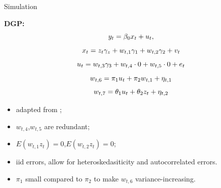 \documentclass[final]{beamer}
\newlength{\colwidth}
\begin{document}
\begin{frame}[t]
\begin{columns}[t]
\begin{column}{\colwidth}
  
  \begin{block}{Simulation}
    \begin{minipage}[c]{0.5\textwidth}
    \textbf{DGP:}
     $$
  y_{t}=\beta_{0}x_{t}+u_{t}, 
\vspace{-3mm}
  $$  
  $$ 
  x_{t}= z_{t}\gamma_z +  w_{t,1}\gamma_{1}+w_{t,2}\gamma_{2}+v_{t}
  \vspace{-3mm}
   $$
    $$
  u_{t}=w_{t,3}\gamma_{3}+w_{t,4}\cdot 0+w_{t,5}\cdot 0+e_{t}
  \vspace{-3mm}
  $$
  $$
    w_{t,6}=\pi_1 u_t + \pi_2w_{t,1} +\eta_{t,1}
  \vspace{-3mm}
  $$
  $$
    w_{t,7}=\theta_1 u_t + \theta_2z_{t} +\eta_{t,2}
  \vspace{-3mm}
  $$
  \end{minipage}
  \hfill 
  \begin{minipage}[c]{0.50\textwidth}
        \begin{itemize}[label = \bullet]
            \item adapted from \cite{cheng2015select};
            \item $w_{t,4}$,$w_{t,5}$ are redundant;
            \item $E(w_{t,1}z_t)=0$,$E(w_{t,2}z_t)=0$;
            \item iid errors, allow for heteroskedasiticity and autocorrelated errors.
            \item $\pi_1$ small compared to $\pi_2$ to make $w_{t,6}$ variance-increasing.
        \end{itemize}
        
  \end{minipage}


\end{block}
\end{column}
\end{columns}
\end{frame}
\end{document}

